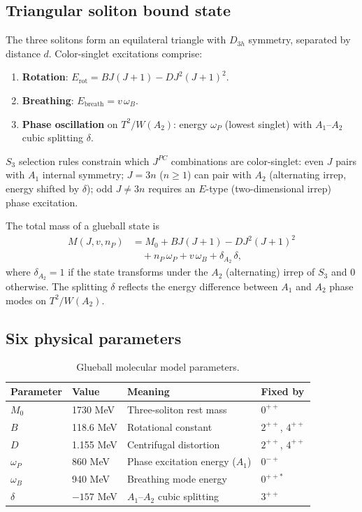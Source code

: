 \documentclass[a4paper,12pt]{article}
\begin{document}
\subsection{Triangular soliton bound state}

The three solitons form an equilateral triangle with $D_{3h}$
symmetry, separated by distance $d$. Color-singlet excitations
comprise:
\begin{enumerate}
 \item \textbf{Rotation}: $E_{\mathrm{rot}} = BJ(J+1) - DJ^2(J+1)^2$.
 \item \textbf{Breathing}: $E_{\mathrm{breath}} = v\,\omega_B$.
 \item \textbf{Phase oscillation} on $T^2/W(A_2)$: energy $\omega_P$
 (lowest singlet) with $A_1$--$A_2$ cubic splitting $\delta$.
\end{enumerate}

$S_3$ selection rules constrain which $J^{PC}$ combinations are
color-singlet: even $J$ pairs with $A_1$ internal symmetry;
$J = 3n$ ($n \geq 1$) can pair with $A_2$ (alternating irrep,
energy shifted by $\delta$); odd $J \neq 3n$ requires an
$E$-type (two-dimensional irrep) phase excitation.

The total mass of a glueball state is
\begin{align}
\label{eq:glueballmass}
 M(J, v, n_P) &= M_0 + BJ(J+1) - DJ^2(J+1)^2 \nonumber\\
 &\quad + n_P\,\omega_P + v\,\omega_B + \delta_{A_2}\,\delta,
\end{align}
where $\delta_{A_2} = 1$ if the state transforms under the $A_2$
(alternating) irrep of $S_3$ and 0 otherwise. The splitting
$\delta$ reflects the energy difference between $A_1$ and $A_2$
phase modes on $T^2/W(A_2)$.

\subsection{Six physical parameters}

\begin{table}[t]
\centering
\caption{Glueball molecular model parameters.}
\label{tab:params}
\begin{tabular}{@{}llll@{}}
\toprule
Parameter & Value & Meaning & Fixed by \\
\midrule
$M_0$ & 1730 MeV & Three-soliton rest mass & $0^{++}$ \\
$B$ & 118.6 MeV & Rotational constant & $2^{++}$, $4^{++}$ \\
$D$ & 1.155 MeV & Centrifugal distortion & $2^{++}$, $4^{++}$ \\
$\omega_P$ & 860 MeV & Phase excitation energy ($A_1$) & $0^{-+}$ \\
$\omega_B$ & 940 MeV & Breathing mode energy & $0^{++*}$ \\
$\delta$ & $-157$ MeV & $A_1$--$A_2$ cubic splitting & $3^{++}$ \\
\bottomrule
\end{tabular}
\end{table}
\end{document}
